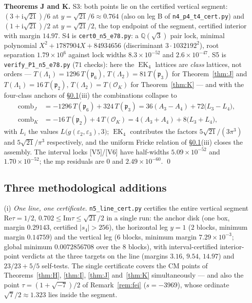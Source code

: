 \documentclass[11pt]{article}
\newcommand{\Qq}{\mathbb{Q}}
\newcommand{\ii}{\mathrm{i}}
\newcommand{\OO}{\mathcal{O}}
\newcommand{\ReT}{\mathrm{Re}}
\newcommand{\ImT}{\mathrm{Im}}
\DeclareMathOperator{\EK}{EK}
\theoremstyle{definition}
\theoremstyle{remark}
\begin{document}
\textbf{Theorems J and K.} S3: both points lie on the certified
vertical segment: $(3+\ii\sqrt{21})/6$ at $y=\sqrt{21}/6\approx0.764$
(also on leg B of \texttt{n4\_p4\_t4\_cert.py}) and
$(1+\ii\sqrt{21})/2$ at $y=\sqrt{21}/2$, the top endpoint of the
segment, certified interior with margin $14.97$. S4 is
\texttt{cert0\_n5\_e78.py}: a $\Qq(\sqrt3)$ pair lock, minimal
polynomial $X^2+1787904X+84934656$ (discriminant
$3\cdot1032192^2$), root separation $1.79\times10^{6}$ against lock
widths $8.3\times10^{-52}$ and $2.6\times10^{-47}$. S5 is
\texttt{verify\_P1\_n5\_e78.py} ($71$ checks): here the $\EK_4$
lattices are \emph{class} lattices, not orders ---
$T(\Lambda_1)=1296\,T(\mathfrak p_6)$,
$T(\Lambda_2)=81\,T(\mathfrak p_3)$ for Theorem~\ref{thm:J} and
$T(\Lambda_1)=16\,T(\mathfrak p_2)$, $T(\Lambda_2)=T(\OO_K)$ for
Theorem~\ref{thm:K} --- and with the four-class anchors of
\S\ref{subsec:app6new}(iii) the combinations collapse to
\begin{align*}
  \mathrm{comb}_J&=-1296\,T(\mathfrak p_6)+324\,T(\mathfrak p_3)
   =36(A_3-A_4)+72\bigl(L_3-L_4\bigr),\\
  \mathrm{comb}_K&=-16\,T(\mathfrak p_2)+4\,T(\OO_K)
   =4(A_3+A_4)+8\bigl(L_3+L_4\bigr),
\end{align*}
with $L_i$ the values $L\bigl(g(\varepsilon_2,\varepsilon_3),3\bigr)$;
$\EK_4$ contributes the factors $5\sqrt{21}/(3\pi^3)$ and
$5\sqrt{21}/\pi^3$ respectively, and the uniform Fricke relation of
\S\ref{subsec:app6new}(iii) closes the assembly. The interval locks
[V5]/[V6] have half-widths $5.09\times10^{-52}$ and
$1.70\times10^{-52}$; the mp residuals are $0$ and
$2.49\times10^{-60}$. \qed

\subsection{Three methodological additions}\label{subsec:app6new}

(i) \emph{One line, one certificate.}
\texttt{n5\_line\_cert.py} certifies the entire vertical segment
$\ReT\tau=1/2$, $0.702\le\ImT\tau\le\sqrt{21}/2$ in a single run:
the anchor disk (one box, margin $0.29143$, certified $|s_4|>256$),
the horizontal leg $y=1$ ($2$ blocks, minimum margin $0.14759$) and
the vertical leg ($6$ blocks, minimum margin $7.29\times10^{-3}$;
global minimum $0.0072856708$ over the $8$ blocks), with
interval-certified interior-point verdicts at the three targets on
the line (margins $3.16$, $9.54$, $14.97$) and $23/23+5/5$
self-tests. The single certificate covers the CM points of
Theorems~\ref{thm:H}, \ref{thm:I}, \ref{thm:J} and~\ref{thm:K}
simultaneously --- and also the point $\tau=(1+\sqrt{-7})/2$ of
Remark~\ref{rem:fei} ($s=-3969$), whose ordinate
$\sqrt7/2\approx1.323$ lies inside the segment.
\end{document}
